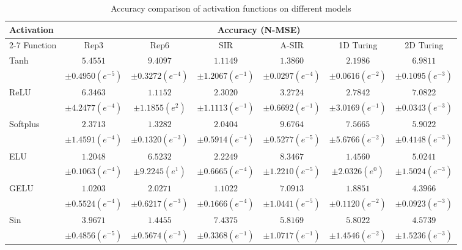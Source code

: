 \begin{table*}[!htb]
\centering
\scriptsize
\caption[Accuracy comparison of activation functions on different models] {Accuracy comparison of activation functions on different models}
\label{tab:exp2}
\begin{tabular}{ l cccccc } 
\toprule
\multirow{2}{*}{Activation} & 
\multicolumn{6}{c}{Accuracy (N-MSE)} \\
\cmidrule(l){2-7} 
Function & Rep3 & Rep6 &  SIR & A-SIR & 1D Turing & 2D Turing \\
\midrule 
\midrule 
\multirow{2}{*}{Tanh} & $5.4551$ & $9.4097$ & $1.1149$ & $1.3860$ & $2.1986$ & $6.9811$ \\ 
 & $\pm0.4950 (e^{-5})$ & $\pm0.3272 (e^{-4})$ & $\pm1.2067 (e^{-1})$ & $\pm0.0297 (e^{-4})$ & $\pm0.0616 (e^{-2})$ & $\pm0.1095 (e^{-3})$ \\
\multirow{2}{*}{ReLU} & $6.3463$ & $1.1152$ & $2.3020$ & $3.2724$ & $2.7842$ & $7.0822$ \\ 
 & $\pm4.2477 (e^{-4})$ & $\pm1.1855 (e^{2})$ & $\pm1.1113 (e^{-1})$ & $\pm0.6692 (e^{-1})$ & $\pm3.0169 (e^{-1})$ & $\pm0.0343 (e^{-3})$ \\
\multirow{2}{*}{Softplus} & $2.3713$ & $1.3282$ & $2.0404$ & $9.6764$ & $7.5665$ & $5.9022$ \\ 
 & $\pm1.4591 (e^{-4})$ & $\pm0.1320 (e^{-3})$ & $\pm0.5914 (e^{-4})$ & $\pm0.5277 (e^{-5})$ & $\pm5.6766 (e^{-2})$ & $\pm0.4148 (e^{-3})$ \\
\multirow{2}{*}{ELU} & $1.2048$ & $6.5232$ & $2.2249$ & $8.3467$ & $1.4560$ & $5.0241$ \\ 
 & $\pm0.1063 (e^{-4})$ & $\pm9.2245 (e^{1})$ & $\pm0.6665 (e^{-4})$ & $\pm1.2210 (e^{-5})$ & $\pm2.0326 (e^{0})$ & $\pm1.5024 (e^{-3})$ \\
\multirow{2}{*}{GELU} & $1.0203$ & $2.0271$ & $1.1022$ & $7.0913$ & $1.8851$ & $4.3966$ \\ 
 & $\pm0.5524 (e^{-4})$ & $\pm0.6217 (e^{-3})$ & $\pm0.1666 (e^{-4})$ & $\pm1.0441 (e^{-5})$ & $\pm0.1120 (e^{-2})$ & $\pm0.0923 (e^{-3})$ \\
\multirow{2}{*}{Sin} & $3.9671$ & $1.4455$ & $7.4375$ & $5.8169$ & $5.8022$ & $4.5739$ \\ 
 & $\pm0.4856 (e^{-5})$ & $\pm0.5674 (e^{-3})$ & $\pm0.3368 (e^{-1})$ & $\pm1.0717 (e^{-1})$ & $\pm1.4546 (e^{-2})$ & $\pm1.5236 (e^{-3})$ \\

\end{tabular}
\end{table*}
